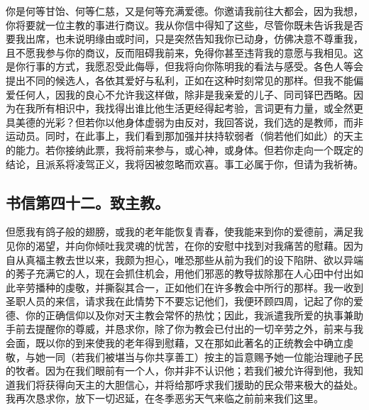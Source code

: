 \par

你是何等甘饴、何等仁慈，又是何等充满爱德。你邀请我前往大都会，因为我想，你将要就一位主教的事进行商议。我从你信中得知了这些，尽管你既未告诉我是否要我出席，也未说明缘由或时间，只是突然告知我你已动身，仿佛决意不尊重我，且不愿我参与你的商议，反而阻碍我前来，免得你甚至违背我的意愿与我相见。这是你行事的方式，我愿忍受此侮辱，但我将向你陈明我的看法与感受。各色人等会提出不同的候选人，各依其爱好与私利，正如在这种时刻常见的那样。但我不能偏爱任何人，因我的良心不允许我这样做，除非是我亲爱的儿子、同司铎巴西略。因为在我所有相识中，我找得出谁比他生活更经得起考验，言词更有力量，或全然更具美德的光彩？但若你以他身体虚弱为由反对，我回答说，我们选的是教师，而非运动员。同时，在此事上，我们看到那加强并扶持软弱者（倘若他们如此）的天主的能力。若你接纳此票，我将前来参与，或心神，或身体。但若你走向一个既定的结论，且派系将凌驾正义，我将因被忽略而欢喜。事工必属于你，但请为我祈祷。\par


\subsection{书信第四十二。致主教。}

\par

但愿我有鸽子般的翅膀，或我的老年能恢复青春，使我能来到你的爱德前，满足我见你的渴望，并向你倾吐我灵魂的忧苦，在你的安慰中找到对我痛苦的慰藉。因为自从真福主教去世以来，我颇为担心，唯恐那些从前为我们的设下陷阱、欲以异端的莠子充满它的人，现在会抓住机会，用他们邪恶的教导拔除那在人心田中付出如此辛劳播种的虔敬，并撕裂其合一，正如他们在许多教会中所行的那样。我一收到圣职人员的来信，请求我在此情势下不要忘记他们，我便环顾四周，记起了你的爱德、你的正确信仰以及你对天主教会常怀的热忱；因此，我派遣我所爱的执事兼助手前去提醒你的尊威，并恳求你，除了你为教会已付出的一切辛劳之外，前来与我会面，既以你的到来使我的老年得到慰藉，又在那如此著名的正统教会中确立虔敬，与她一同（若我们被堪当与你共享善工）按主的旨意赐予她一位能治理祂子民的牧者。因为在我们眼前有一个人，你并非不认识他；若我们被允许得到他，我知道我们将获得向天主的大胆信心，并将给那呼求我们援助的民众带来极大的益处。我再次恳求你，放下一切迟延，在冬季恶劣天气来临之前前来我们这里。\par

